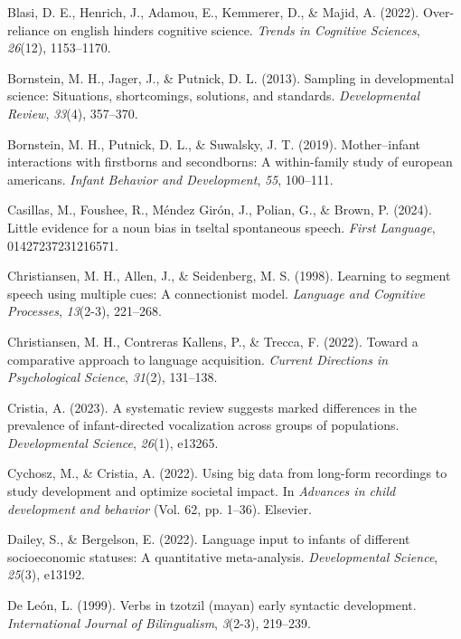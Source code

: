 \documentclass[
  man,floatsintext]{apa6}
\newlength{\cslhangindent}
\newenvironment{CSLReferences}[2] %
 {\begin{list}{}{%
  \setlength{\itemindent}{0pt}
  \setlength{\leftmargin}{0pt}
  \setlength{\parsep}{0pt}
  \ifodd #1
   \setlength{\leftmargin}{\cslhangindent}
   \setlength{\itemindent}{-1\cslhangindent}
  \fi
  \setlength{\itemsep}{#2\baselineskip}}}
 {\end{list}}
\begin{document}
\begin{CSLReferences}{1}{0}
Blasi, D. E., Henrich, J., Adamou, E., Kemmerer, D., \& Majid, A. (2022). Over-reliance on english hinders cognitive science. \emph{Trends in Cognitive Sciences}, \emph{26}(12), 1153--1170.

Bornstein, M. H., Jager, J., \& Putnick, D. L. (2013). Sampling in developmental science: Situations, shortcomings, solutions, and standards. \emph{Developmental Review}, \emph{33}(4), 357--370.

Bornstein, M. H., Putnick, D. L., \& Suwalsky, J. T. (2019). Mother--infant interactions with firstborns and secondborns: A within-family study of european americans. \emph{Infant Behavior and Development}, \emph{55}, 100--111.

Casillas, M., Foushee, R., Méndez Girón, J., Polian, G., \& Brown, P. (2024). Little evidence for a noun bias in tseltal spontaneous speech. \emph{First Language}, 01427237231216571.

Christiansen, M. H., Allen, J., \& Seidenberg, M. S. (1998). Learning to segment speech using multiple cues: A connectionist model. \emph{Language and Cognitive Processes}, \emph{13}(2-3), 221--268.

Christiansen, M. H., Contreras Kallens, P., \& Trecca, F. (2022). Toward a comparative approach to language acquisition. \emph{Current Directions in Psychological Science}, \emph{31}(2), 131--138.

Cristia, A. (2023). A systematic review suggests marked differences in the prevalence of infant-directed vocalization across groups of populations. \emph{Developmental Science}, \emph{26}(1), e13265.

Cychosz, M., \& Cristia, A. (2022). Using big data from long-form recordings to study development and optimize societal impact. In \emph{Advances in child development and behavior} (Vol. 62, pp. 1--36). Elsevier.

Dailey, S., \& Bergelson, E. (2022). Language input to infants of different socioeconomic statuses: A quantitative meta-analysis. \emph{Developmental Science}, \emph{25}(3), e13192.

De León, L. (1999). Verbs in tzotzil (mayan) early syntactic development. \emph{International Journal of Bilingualism}, \emph{3}(2-3), 219--239.


\end{CSLReferences}
\end{document}
